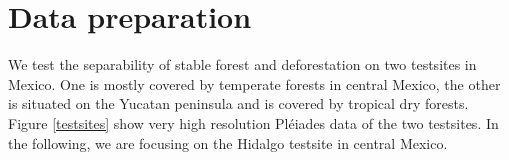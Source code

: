\documentclass{article}
\begin{document}


\section{Data preparation}
We test the separability of stable forest and deforestation on two testsites in Mexico.
One is mostly covered by temperate forests in central Mexico,
the other is situated on the Yucatan peninsula and is covered by tropical dry forests.
Figure \ref{testsites} show very high resolution Pléiades data of the two testsites.
In the following, we are focusing on the Hidalgo testsite in central Mexico. 
\end{document}
